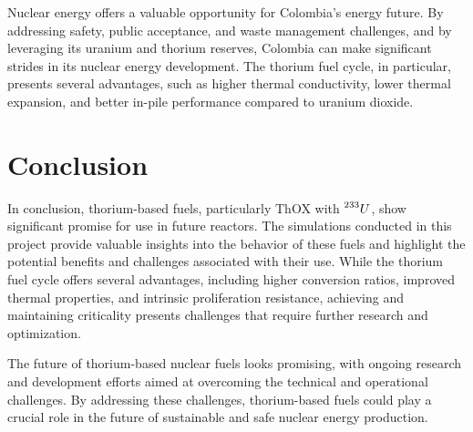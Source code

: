 Nuclear energy offers a valuable opportunity for Colombia's energy future. By addressing safety, public acceptance, and waste management challenges, and by leveraging its uranium and thorium reserves, Colombia can make significant strides in its nuclear energy development. The thorium fuel cycle, in particular, presents several advantages, such as higher thermal conductivity, lower thermal expansion, and better in-pile performance compared to uranium dioxide.

\section{Conclusion}

In conclusion, thorium-based fuels, particularly ThOX with \(\prescript{233}{}{U}\), show significant promise for use in future reactors. The simulations conducted in this project provide valuable insights into the behavior of these fuels and highlight the potential benefits and challenges associated with their use. While the thorium fuel cycle offers several advantages, including higher conversion ratios, improved thermal properties, and intrinsic proliferation resistance, achieving and maintaining criticality presents challenges that require further research and optimization.

The future of thorium-based nuclear fuels looks promising, with ongoing research and development efforts aimed at overcoming the technical and operational challenges. By addressing these challenges, thorium-based fuels could play a crucial role in the future of sustainable and safe nuclear energy production.